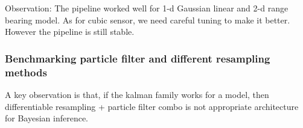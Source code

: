 \documentclass{article}
\begin{document}

Observation: The pipeline worked well for 1-d Gaussian linear and 2-d range bearing model. As for cubic sensor, we need careful tuning to make it better. However the pipeline is still stable. 

\subsubsection{Benchmarking particle filter and different resampling methods}
A key observation is that, if the kalman family works for a model, then differentiable resampling + particle filter combo is not appropriate architecture for Bayesian inference.




\end{document}
